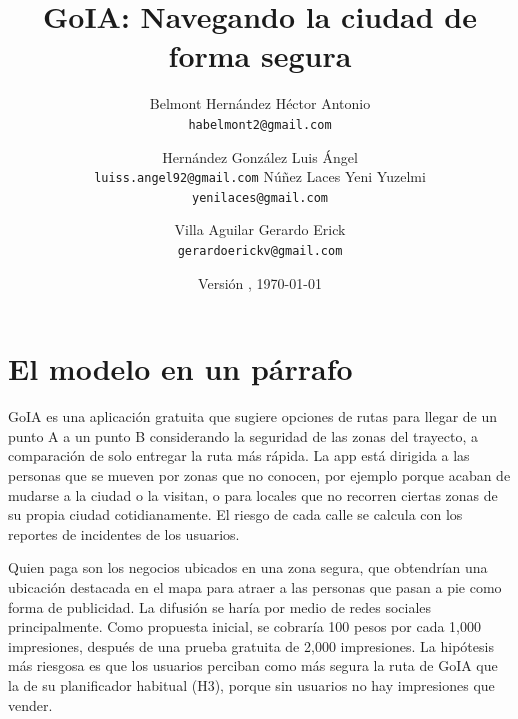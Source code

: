 \documentclass[11pt]{article}
\title{GoIA: Navegando la ciudad de forma segura}
\author{%
  Belmont Hernández Héctor Antonio\\ {\small\texttt{habelmont2@gmail.com}}
  \and
  Hernández González Luis Ángel\\ {\small\texttt{luiss.angel92@gmail.com}}
  \otrorenglon
  Núñez Laces Yeni Yuzelmi\\ {\small\texttt{yenilaces@gmail.com}}
  \and
  Villa Aguilar Gerardo Erick\\ {\small\texttt{gerardoerickv@gmail.com}}
}
\date{Versión \pendiente{1}, \today}
\begin{document}
\maketitle
\thispagestyle{empty}

\section{El modelo en un párrafo}
\label{sec:resumen}

GoIA es una aplicación gratuita que sugiere opciones de rutas para llegar de un punto A a un punto B considerando la seguridad de las zonas del trayecto, a comparación de solo entregar la ruta más rápida. La app está dirigida a las personas que se mueven por zonas que no
conocen, por ejemplo porque acaban de mudarse a la ciudad o la visitan, o para locales que no recorren ciertas zonas de su propia ciudad cotidianamente. El riesgo de cada calle se calcula con los reportes de incidentes de los usuarios. 

Quien
paga son los negocios ubicados en una zona segura, que obtendrían una ubicación
destacada en el mapa para atraer a las personas que pasan a pie como forma de publicidad. La difusión se haría por medio de redes sociales principalmente. Como propuesta inicial, se cobraría 100 pesos por cada 1,000
impresiones, después de una prueba gratuita de 2,000 impresiones. La hipótesis más riesgosa es que
los usuarios perciban como más segura la ruta de GoIA que la de su planificador habitual (H3),
porque sin usuarios no hay impresiones que vender.



\end{document}
